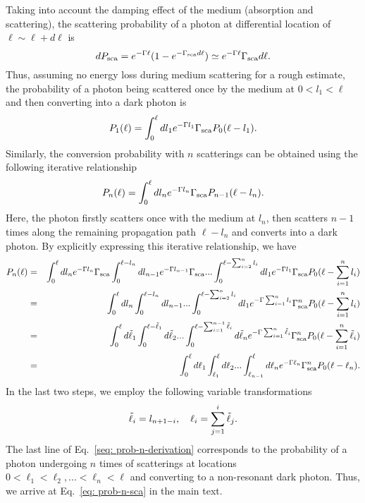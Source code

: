 \documentclass[prd,showpacs,preprintnumbers,amsmath,amssymb,twocolumn,superscriptaddress,notitlepage]{revtex4-2}
\begin{document}
\begin{widetext}
Taking into account the damping effect of the medium (absorption and scattering), the scattering probability of a photon at differential location of $\ell\sim\ell+d\ell$ is 
\begin{equation}
d P_{\rm sca} = e^{- \Gamma \ell} (1 - e^{- \Gamma_{\rm sca} d \ell})
\simeq e^{- \Gamma \ell} \Gamma_{\rm sca} d \ell.
\end{equation} 
Thus, assuming no energy loss during medium scattering for a rough estimate, the probability of a photon being scattered once by the medium at $0< l_1 < \ell$ and then converting into a dark photon is 
\begin{equation}
P_1 (\ell) = \int_0^\ell d l_1 e^{-\Gamma l_1} \Gamma_{\rm sca} P_0 (\ell - l_1).
\end{equation}
Similarly, the conversion probability with $n$ scatterings can be obtained using the following iterative relationship
\begin{equation}
P_n (\ell) = \int_0^\ell d l_n e^{-\Gamma l_n} \Gamma_{\rm sca}
P_{n-1} (\ell - l_{n}).
\end{equation}
Here, the photon firstly scatters once with the medium at $l_n$, then scatters $n-1$ times along the remaining propagation path $\ell - l_n$ and converts into a dark photon. 
By explicitly expressing this iterative relationship, we have
\begin{eqnarray} 
P_n (\ell)
&=& \int_0^\ell d l_n e^{-\Gamma l_n} \Gamma_{\rm sca}
\int_0^{\ell- l_n} d l_{n-1} e^{-\Gamma l_{n-1}} \Gamma_{\rm sca} 
...
\int_0^{\ell- \sum_{i=2}^n l_i} d l_1 e^{-\Gamma l_1} \Gamma_{\rm sca} 
P_0 (\ell - \sum_{i=1}^n l_i) \nonumber \\
&=& \int_0^\ell d l_n
\int_0^{\ell- l_n} d l_{n-1} 
...
\int_0^{\ell- \sum_{i=2}^n l_i} d l_1 e^{-\Gamma \sum_{i=1}^n l_i} \Gamma_{\rm sca}^n 
P_0 (\ell - \sum_{i=1}^n l_i) \nonumber \\
&=& \int_0^\ell d \Tilde{\ell}_1
\int_0^{\ell- \Tilde{\ell}_1} d \Tilde{\ell}_2 
...
\int_0^{\ell- \sum_{i=1}^{n-1} \Tilde{\ell}_i} d \Tilde{\ell}_n e^{-\Gamma \sum_{i=1}^n \Tilde{\ell}_i} \Gamma_{\rm sca}^n 
P_0 (\ell - \sum_{i=1}^n \Tilde{\ell}_i) \nonumber \\
&=& \int_{0}^\ell d \ell_1 
\int_{\ell_1}^\ell d \ell_2 ... 
\int_{\ell_{n-1}}^\ell d \ell_n
e^{-\Gamma \ell_n} \Gamma_{\rm sca}^n P_0(\ell -\ell_n). 
\label{seq: prob-n-derivation}
\end{eqnarray}
In the last two steps, we employ the following variable transformations
\begin{equation}
\Tilde{\ell}_i = l_{n+1 -i},\quad
\ell_i = \sum_{j=1}^i \Tilde{\ell}_j .
\end{equation}
The last line of Eq.~\eqref{seq: prob-n-derivation} corresponds to 
the probability 
of a photon undergoing $n$ times of scatterings
at locations $0 < \ell_1 < \ell_2, ... < \ell_n < \ell$
and converting to a non-resonant dark photon. Thus, we arrive at Eq.~\eqref{eq: prob-n-sca} in the main text.






\end{widetext}
\end{document}
